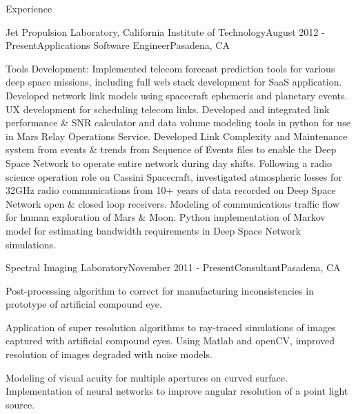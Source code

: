 \documentclass{resume} %
\begin{document}
\begin{rSection}{Experience}
\begin{rSubsection}{Jet Propulsion Laboratory, California Institute of Technology}{August 2012 - Present}{Applications Software Engineer}{Pasadena, CA}
\item {Tools Development:} Implemented telecom forecast prediction tools for various deep space missions, including full web stack development for SaaS application. Developed network link models using spacecraft ephemeris and planetary events. UX development for scheduling telecom links. Developed and integrated link performance \& SNR calculator and data volume modeling tools in python for use in Mars Relay Operations Service. Developed Link Complexity and Maintenance system from events \& trends from Sequence of Events files to enable the Deep Space Network to operate entire network during day shifts. Following a radio science operation role on Cassini Spacecraft, investigated atmospheric losses for 32GHz radio communications from 10+ years of data recorded on Deep Space Network open \& closed loop receivers. Modeling of communications traffic flow for human exploration of Mars \& Moon. Python implementation of Markov model for estimating bandwidth requirements in Deep Space Network simulations.

\end{rSubsection}


\begin{rSubsection}{Spectral Imaging Laboratory}{November 2011 - Present}{Consultant}{Pasadena, CA}
\item Post-processing algorithm to correct for manufacturing inconsistencies in prototype of artificial compound eye.
\item Application of super resolution algorithms to ray-traced simulations of images captured with artificial compound eyes. Using Matlab and openCV, improved resolution of images degraded with noise models.
\item Modeling of visual acuity for multiple apertures on curved surface. Implementation of neural networks to improve angular resolution of a point light source. 
\end{rSubsection}





\end{rSection}
\end{document}
